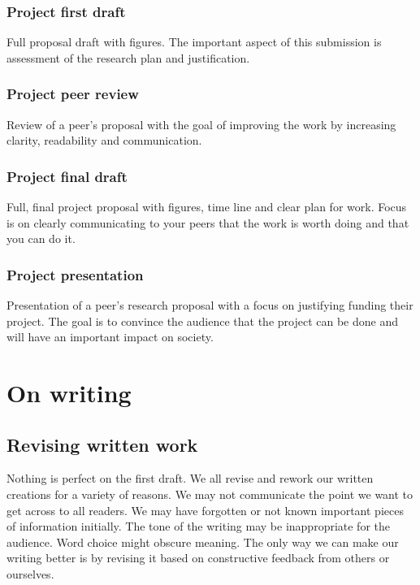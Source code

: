 \documentclass[11pt,]{article}
\begin{document}
\hypertarget{project-first-draft}{%
\subsubsection{Project first draft}\label{project-first-draft}}

Full proposal draft with figures. The important aspect of this
submission is assessment of the research plan and justification.

\hypertarget{project-peer-review}{%
\subsubsection{Project peer review}\label{project-peer-review}}

Review of a peer's proposal with the goal of improving the work by
increasing clarity, readability and communication.

\hypertarget{project-final-draft}{%
\subsubsection{Project final draft}\label{project-final-draft}}

Full, final project proposal with figures, time line and clear plan for
work. Focus is on clearly communicating to your peers that the work is
worth doing and that you can do it.

\hypertarget{project-presentation}{%
\subsubsection{Project presentation}\label{project-presentation}}

Presentation of a peer's research proposal with a focus on justifying
funding their project. The goal is to convince the audience that the
project can be done and will have an important impact on society.

\hypertarget{on-writing}{%
\section{On writing}\label{on-writing}}

\hypertarget{revising-written-work}{%
\subsection{Revising written work}\label{revising-written-work}}

Nothing is perfect on the first draft. We all revise and rework our
written creations for a variety of reasons. We may not communicate the
point we want to get across to all readers. We may have forgotten or not
known important pieces of information initially. The tone of the writing
may be inappropriate for the audience. Word choice might obscure
meaning. The only way we can make our writing better is by revising it
based on constructive feedback from others or ourselves.
\end{document}
